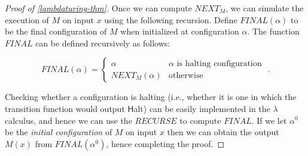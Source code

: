 \begin{proof}[Proof of \cref{lambdaturing-thm}]

Once we can compute \(\ensuremath{\mathit{NEXT}}_M\), we can simulate
the execution of \(M\) on input \(x\) using the following recursion.
Define \(\ensuremath{\mathit{FINAL}}(\alpha)\) to be the final
configuration of \(M\) when initialized at configuration \(\alpha\). The
function \(\ensuremath{\mathit{FINAL}}\) can be defined recursively as
follows:

\[
\ensuremath{\mathit{FINAL}}(\alpha) = \begin{cases}\alpha & \text{$\alpha$ is halting configuration} \\ \ensuremath{\mathit{NEXT}}_M(\alpha) & \text{otherwise}\end{cases}\;.
\]

Checking whether a configuration is halting (i.e., whether it is one in
which the transition function would output \(\mathsf{H}\)alt) can be
easily implemented in the \(\lambda\) calculus, and hence we can use the
\(\ensuremath{\mathit{RECURSE}}\) to compute
\(\ensuremath{\mathit{FINAL}}\). If we let \(\alpha^0\) be the
\emph{initial configuration} of \(M\) on input \(x\) then we can obtain
the output \(M(x)\) from \(\ensuremath{\mathit{FINAL}}(\alpha^0)\),
hence completing the proof.

\end{proof}

